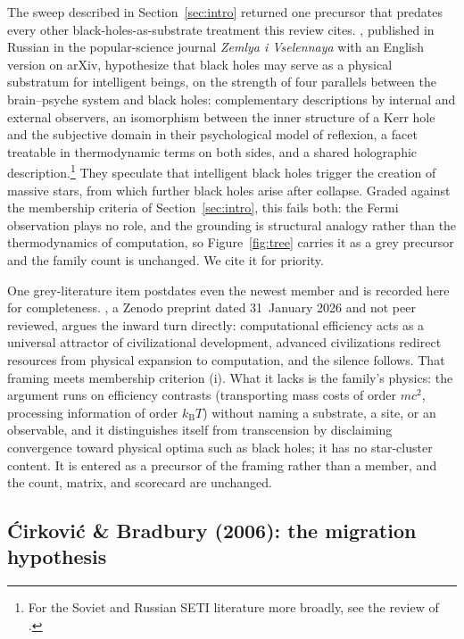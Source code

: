 \documentclass[11pt]{article}
\newcommand{\kb}{\ensuremath{k_{\mathrm{B}}}}
\begin{document}
The sweep described in Section~\ref{sec:intro} returned one precursor that predates every other black-holes-as-substrate treatment this review cites. \citet{Lefebvre2000}, published in Russian in the popular-science journal \emph{Zemlya i Vselennaya} with an English version on arXiv, hypothesize that black holes may serve as a physical substratum for intelligent beings, on the strength of four parallels between the brain--psyche system and black holes: complementary descriptions by internal and external observers, an isomorphism between the inner structure of a Kerr hole and the subjective domain in their psychological model of reflexion, a facet treatable in thermodynamic terms on both sides, and a shared holographic description.\footnote{For the Soviet and Russian SETI literature more broadly, see the review of \citet{Gindilis2019}.} They speculate that intelligent black holes trigger the creation of massive stars, from which further black holes arise after collapse. Graded against the membership criteria of Section~\ref{sec:intro}, this fails both: the Fermi observation plays no role, and the grounding is structural analogy rather than the thermodynamics of computation, so Figure~\ref{fig:tree} carries it as a grey precursor and the family count is unchanged. We cite it for priority.

One grey-literature item postdates even the newest member and is recorded here for completeness. \citet{Kriger2026}, a Zenodo preprint dated 31~January 2026 and not peer reviewed, argues the inward turn directly: computational efficiency acts as a universal attractor of civilizational development, advanced civilizations redirect resources from physical expansion to computation, and the silence follows. That framing meets membership criterion (i). What it lacks is the family's physics: the argument runs on efficiency contrasts (transporting mass costs of order $mc^{2}$, processing information of order $\kb T$) without naming a substrate, a site, or an observable, and it distinguishes itself from transcension by disclaiming convergence toward physical optima such as black holes; it has no star-cluster content. It is entered as a precursor of the framing rather than a member, and the count, matrix, and scorecard are unchanged.

\subsection{\'Cirkovi\'c \& Bradbury (2006): the migration hypothesis}
\end{document}
